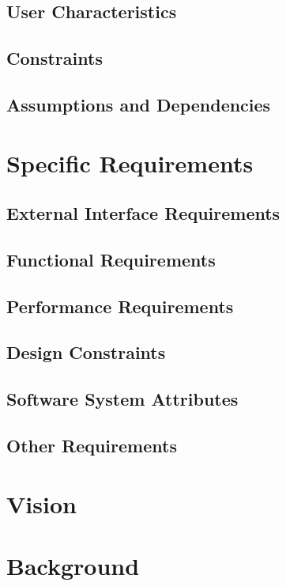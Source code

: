 \documentclass{article}
\begin{document}
    	\subsection{User Characteristics}    
    	\subsection{Constraints}   
    	\subsection{Assumptions and Dependencies}

	\section{Specific Requirements}
    
    	\subsection{External Interface Requirements}
    	\subsection{Functional Requirements}
        \subsection{Performance Requirements}
        \subsection{Design Constraints}
        \subsection{Software System Attributes}
        \subsection{Other Requirements}
	
	\section{Vision}


	\section{Background}
	
\end{document}
